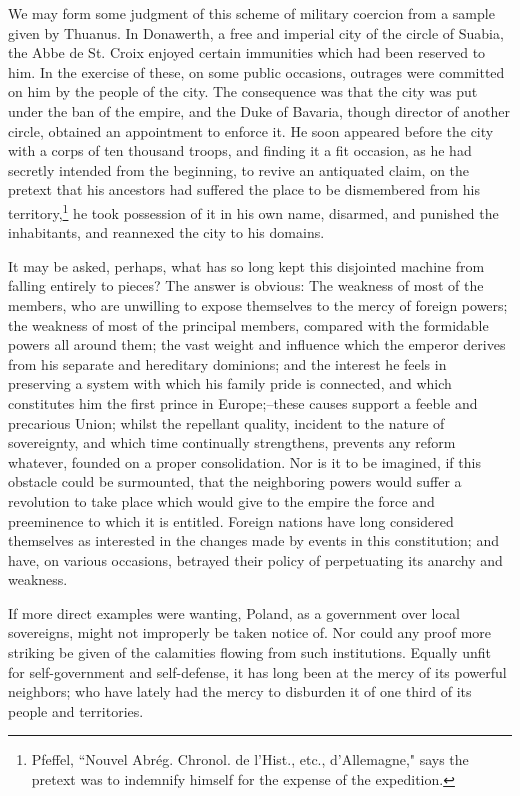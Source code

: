 We may form some judgment of this scheme of military coercion from a sample given by Thuanus. In Donawerth, a free and imperial city of the circle of Suabia, the Abbe de St. Croix enjoyed certain immunities which had been reserved to him. In the exercise of these, on some public occasions, outrages were committed on him by the people of the city. The consequence was that the city was put under the ban of the empire, and the Duke of Bavaria, though director of another circle, obtained an appointment to enforce it. He soon appeared before the city with a corps of ten thousand troops, and finding it a fit occasion, as he had secretly intended from the beginning, to revive an antiquated claim, on the pretext that his ancestors had suffered the place to be dismembered from his territory,\footnote{Pfeffel, ``Nouvel Abrég. Chronol. de l'Hist., etc., d'Allemagne," says the pretext was to indemnify himself for the expense of the expedition.} he took possession of it in his own name, disarmed, and punished the inhabitants, and reannexed the city to his domains.

It may be asked, perhaps, what has so long kept this disjointed machine from falling entirely to pieces? The answer is obvious: The weakness of most of the members, who are unwilling to expose themselves to the mercy of foreign powers; the weakness of most of the principal members, compared with the formidable powers all around them; the vast weight and influence which the emperor derives from his separate and hereditary dominions; and the interest he feels in preserving a system with which his family pride is connected, and which constitutes him the first prince in Europe;--these causes support a feeble and precarious Union; whilst the repellant quality, incident to the nature of sovereignty, and which time continually strengthens, prevents any reform whatever, founded on a proper consolidation. Nor is it to be imagined, if this obstacle could be surmounted, that the neighboring powers would suffer a revolution to take place which would give to the empire the force and preeminence to which it is entitled. Foreign nations have long considered themselves as interested in the changes made by events in this constitution; and have, on various occasions, betrayed their policy of perpetuating its anarchy and weakness.

If more direct examples were wanting, Poland, as a government over local sovereigns, might not improperly be taken notice of. Nor could any proof more striking be given of the calamities flowing from such institutions. Equally unfit for self-government and self-defense, it has long been at the mercy of its powerful neighbors; who have lately had the mercy to disburden it of one third of its people and territories.

